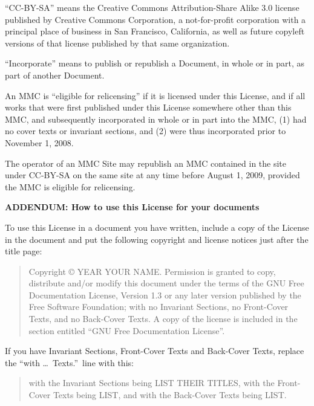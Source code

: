 \documentclass{scrbook}
\begin{document}
``CC-BY-SA'' means the Creative Commons Attribution-Share Alike 3.0
license published by Creative Commons Corporation, a not-for-profit
corporation with a principal place of business in San Francisco,
California, as well as future copyleft versions of that license
published by that same organization.

``Incorporate'' means to publish or republish a Document, in whole or
in part, as part of another Document.

An MMC is ``eligible for relicensing'' if it is licensed under this
License, and if all works that were first published under this License
somewhere other than this MMC, and subsequently incorporated in whole
or in part into the MMC, (1) had no cover texts or invariant sections,
and (2) were thus incorporated prior to November 1, 2008.

The operator of an MMC Site may republish an MMC contained in the site
under CC-BY-SA on the same site at any time before August 1, 2009,
provided the MMC is eligible for relicensing.


\begin{center}
{\Large\bfseries ADDENDUM: How to use this License for your documents\par}
\end{center}
To use this License in a document you have written, include a copy of
the License in the document and put the following copyright and
license notices just after the title page:

\bigskip
\begin{quote}
    Copyright \copyright{}  YEAR  YOUR NAME.
    Permission is granted to copy, distribute and/or modify this document
    under the terms of the GNU Free Documentation License, Version 1.3
    or any later version published by the Free Software Foundation;
    with no Invariant Sections, no Front-Cover Texts, and no Back-Cover Texts.
    A copy of the license is included in the section entitled ``GNU
    Free Documentation License''.
\end{quote}
\bigskip
    
If you have Invariant Sections, Front-Cover Texts and Back-Cover Texts,
replace the ``with \dots\ Texts.''\ line with this:

\bigskip
\begin{quote}
    with the Invariant Sections being LIST THEIR TITLES, with the
    Front-Cover Texts being LIST, and with the Back-Cover Texts being LIST.
\end{quote}
\bigskip
    
\end{document}
